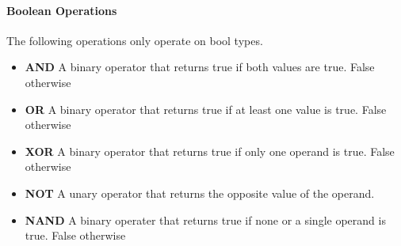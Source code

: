 \paragraph{Boolean Operations}
\label{sec:boolOps}

The following operations only operate on bool types.

\begin{itemize}
  \item \textbf{AND} A binary operator that returns true if both values are true. False otherwise
  \item \textbf{OR} A binary operator that returns true if at least one value is true. False otherwise
  \item \textbf{XOR} A binary operator that returns true if only one operand is true. False otherwise
  \item \textbf{NOT} A unary operator that returns the opposite value of the operand.
  \item \textbf{NAND} A binary operater that returns true if none or a single operand is true. False otherwise
\end{itemize}
